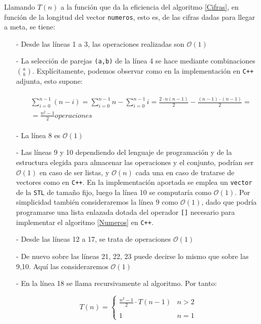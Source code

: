 \documentclass[a4paper,10pt]{scrartcl}
\def\C++#1{\texttt{#1}}
\begin{document}
   Llamando $T(n)$ a la función que da la eficiencia del algoritmo \ref{Cifras},
   en función de la longitud del vector \C++{numeros}, esto es, de las cifras
   dadas para llegar a meta, se tiene:
   \begin{itemize} 
    \item [-] Desde las líneas 1 a 3, las operaciones realizadas son $\mathcal{O}(1)$
    \item [-] La selección de parejas \C++{(a,b)} de la línea 4 se hace mediante
    combinaciones ${a\choose b}$. Explícitamente, podemos observar como en
    la implementación en \C++{C++} adjunta, esto supone:
    
    \begin{gather*}
    \begin{split}
        &\sum_{i=0}^{n-1}(n-i)=\sum_{i=0}^{n-1}n-\sum_{i=0}^{n-1}i=
        \frac{2\cdot n(n-1)}{2}-\frac{(n-1)\cdot(n-1)}{2}=\\
        &=\frac{n^2-1}{2}  operaciones 
    \end{split}
    \end{gather*}
        
    \item [-] La línea 8 es $\mathcal{O}(1)$
    \item [-] Las líneas 9 y 10 dependiendo del lenguaje de programación y de
    la estructura elegida para almacenar las operaciones y el conjunto, podrían
    ser $\mathcal{O}(1)$ en caso de ser listas, y $\mathcal{O}(n)$ cada una en
    caso de tratarse de vectores como en \C++{C++}. En la implementación
    aportada se emplea un \C++{vector} de la \C++{STL} de tamaño fijo,
    luego la línea 10 se computaría como $\mathcal{O}(1)$. Por simplicidad
    también consideraremos la línea 9 como $\mathcal{O}(1)$, dado que podría
    programarse una lista enlazada dotada del operador \C++{[]} necesario
    para implementar el algoritmo \ref{Numeros} en \C++{C++}.
    
    \item [-] Desde las líneas 12 a 17, se trata de operaciones $\mathcal{O}(1)$
    \item [-] De nuevo sobre las líneas 21, 22, 23 puede decirse lo mismo que sobre
    las 9,10. Aquí las consideraremos $\mathcal{O}(1)$
    \item [-] En la línea 18 se llama recursivamente al algoritmo. Por tanto:
    
    $$T(n)=\left\{\begin{array}{lr}
                   \frac{n^2-1}{2}\cdot T(n-1) & n>2\\
                   \ \\
                   1 & n=1
                  \end{array}\right.$$
                  

\end{itemize}
\end{document}
